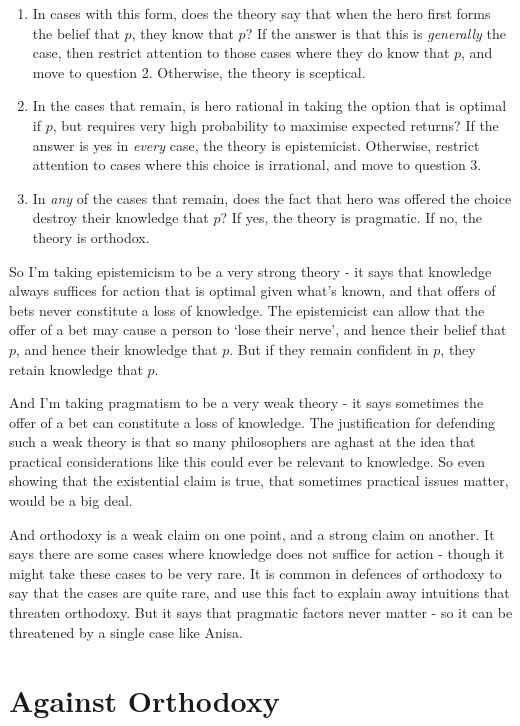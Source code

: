 \documentclass[11pt,]{book}
\providecommand{\tightlist}{%
  \setlength{\itemsep}{0pt}\setlength{\parskip}{0pt}}
\begin{document}
\begin{enumerate}
\def\labelenumi{\arabic{enumi}.}
\tightlist
\item
  In cases with this form, does the theory say that when the hero first forms the belief that \(p\), they know that \(p\)? If the answer is that this is \emph{generally} the case, then restrict attention to those cases where they do know that \(p\), and move to question 2. Otherwise, the theory is sceptical.
\item
  In the cases that remain, is hero rational in taking the option that is optimal if \(p\), but requires very high probability to maximise expected returns? If the answer is yes in \emph{every} case, the theory is epistemicist. Otherwise, restrict attention to cases where this choice is irrational, and move to question 3.
\item
  In \emph{any} of the cases that remain, does the fact that hero was offered the choice destroy their knowledge that \(p\)? If yes, the theory is pragmatic. If no, the theory is orthodox.
\end{enumerate}

So I'm taking epistemicism to be a very strong theory - it says that knowledge always suffices for action that is optimal given what's known, and that offers of bets never constitute a loss of knowledge. The epistemicist can allow that the offer of a bet may cause a person to `lose their nerve', and hence their belief that \(p\), and hence their knowledge that \(p\). But if they remain confident in \(p\), they retain knowledge that \(p\).

And I'm taking pragmatism to be a very weak theory - it says sometimes the offer of a bet can constitute a loss of knowledge. The justification for defending such a weak theory is that so many philosophers are aghast at the idea that practical considerations like this could ever be relevant to knowledge. So even showing that the existential claim is true, that sometimes practical issues matter, would be a big deal.

And orthodoxy is a weak claim on one point, and a strong claim on another. It says there are some cases where knowledge does not suffice for action - though it might take these cases to be very rare. It is common in defences of orthodoxy to say that the cases are quite rare, and use this fact to explain away intuitions that threaten orthodoxy. But it says that pragmatic factors never matter - so it can be threatened by a single case like Anisa.

\hypertarget{orthodox}{%
\section{Against Orthodoxy}\label{orthodox}}
\end{document}
